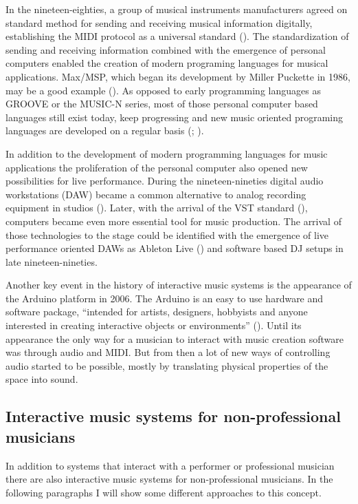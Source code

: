In the nineteen-eighties, a group of musical instruments manufacturers agreed on standard method for sending and receiving musical information digitally, establishing the MIDI protocol as a universal standard (\cite{web:quinn}).
The standardization of sending and receiving information combined with the emergence of personal computers enabled the creation of modern programing languages for musical applications.
Max/MSP, which began its development by Miller Puckette in 1986, may be a good example (\cite[page 16]{winkler01}).
As opposed to early programming languages as GROOVE or the MUSIC-N series, most of those personal computer based languages still exist today, keep progressing and new music oriented programing languages are developed on a regular basis (\cite{web:chuck}; \cite{web:usine}).

In addition to the development of modern programming languages for music applications the proliferation of the personal computer also opened new possibilities for live performance.
During the nineteen-nineties digital audio workstations (DAW) became a common alternative to analog recording equipment in studios ().
Later, with the arrival of the VST standard (\cite{web:steinberg}), computers became even more essential tool for music production.
The arrival of those technologies to the stage could be identified with the emergence of live performance oriented DAWs as Ableton Live (\cite{web:live}) and software based DJ setups in late nineteen-nineties.

Another key event in the history of interactive music systems is the appearance of the Arduino platform in 2006.
The Arduino is an easy to use hardware and software package, ``intended for artists, designers, hobbyists and anyone interested in creating interactive objects or environments'' (\cite{web:arduino}).
Until its appearance the only way for a musician to interact with music creation software was through audio and MIDI.
But from then a lot of new ways of controlling audio started to be possible, mostly by translating physical properties of the space into sound.

\subsection{Interactive music systems for non-professional musicians}

In addition to systems that interact with a performer or professional musician there are also interactive music systems for non-professional musicians.
In the following paragraphs I will show some different approaches to this concept.

